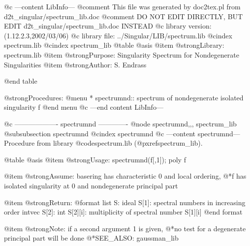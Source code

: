 @c ---content LibInfo---
@comment This file was generated by doc2tex.pl from d2t_singular/spectrum_lib.doc
@comment DO NOT EDIT DIRECTLY, BUT EDIT d2t_singular/spectrum_lib.doc INSTEAD
@c library version: (1.12.2.3,2002/03/06)
@c library file: ../Singular/LIB/spectrum.lib
@cindex spectrum.lib
@cindex spectrum_lib
@table @asis
@item @strong{Library:}
spectrum.lib
@item @strong{Purpose:}
  Singularity Spectrum for Nondegenerate Singularities
@item @strong{Author:}
S. Endrass

@end table

@strong{Procedures:}
@menu
* spectrumnd:: spectrum of nondegenerate isolated singularity f
@end menu
@c ---end content LibInfo---

@c ------------------- spectrumnd -------------
@node spectrumnd,,, spectrum_lib
@subsubsection spectrumnd
@cindex spectrumnd
@c ---content spectrumnd---
Procedure from library @code{spectrum.lib} (@pxref{spectrum_lib}).

@table @asis
@item @strong{Usage:}
spectrumnd(f[,1]); poly f

@item @strong{Assume:}
basering has characteristic 0 and local ordering,
@*f has isolated singularity at 0 and nondegenerate principal part

@item @strong{Return:}
@format
list S:
  ideal S[1]: spectral numbers in increasing order
  intvec S[2]:
    int S[2][i]: multiplicity of spectral number S[1][i]
@end format

@item @strong{Note:}
if a second argument 1 is given,
@*no test for a degenerate principal part will be done
@*SEE_ALSO: gaussman_lib


